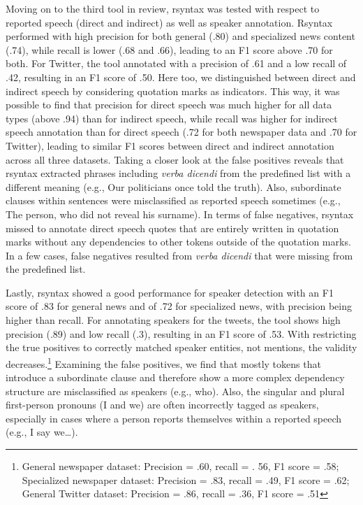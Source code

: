 \documentclass{ccr}
\begin{document}
Moving on to the third tool in review, rsyntax was tested with respect
to reported speech (direct and indirect) as well as speaker annotation.
Rsyntax performed with high precision for both general (.80) and
specialized news content (.74), while recall is lower (.68 and .66),
leading to an F1 score above .70 for both. For Twitter, the tool
annotated with a precision of .61 and a low recall of .42, resulting in
an F1 score of .50. Here too, we distinguished between direct and
indirect speech by considering quotation marks as indicators. This way,
it was possible to find that precision for direct speech was much higher
for all data types (above .94) than for indirect speech, while recall
was higher for indirect speech annotation than for direct speech (.72
for both newspaper data and .70 for Twitter), leading to similar F1
scores between direct and indirect annotation across all three datasets.
Taking a closer look at the false positives reveals that rsyntax
extracted phrases including \textit{verba dicendi} from the predefined
list with a different meaning (e.g., Our politicians once told the
truth). Also, subordinate clauses within sentences were misclassified as
reported speech sometimes (e.g., The person, who did not reveal his
surname). In terms of false negatives, rsyntax missed to annotate direct
speech quotes that are entirely written in quotation marks without any
dependencies to other tokens outside of the quotation marks. In a few
cases, false negatives resulted from \textit{verba dicendi} that were
missing from the predefined list.

Lastly, rsyntax showed a good performance for speaker detection with an
F1 score of .83 for general news and of .72 for specialized news, with
precision being higher than recall. For annotating speakers for the
tweets, the tool shows high precision (.89) and low recall (.3),
resulting in an F1 score of .53. With restricting the true positives to
correctly matched speaker entities, not mentions, the validity
decreases.\footnote{General newspaper dataset: Precision = .60, recall = . 56, F1 score =
.58; Specialized newspaper dataset: Precision = .83, recall = .49, F1 score = .62; General Twitter dataset:
Precision = .86, recall = .36, F1 score = .51} Examining the false
positives, we find that mostly tokens that introduce a subordinate
clause and therefore show a more complex dependency structure are
misclassified as speakers (e.g., who). Also, the singular and plural
first-person pronouns (I and we) are often incorrectly tagged as
speakers, especially in cases where a person reports themselves within a
reported speech (e.g., I say we\ldots).
\end{document}
